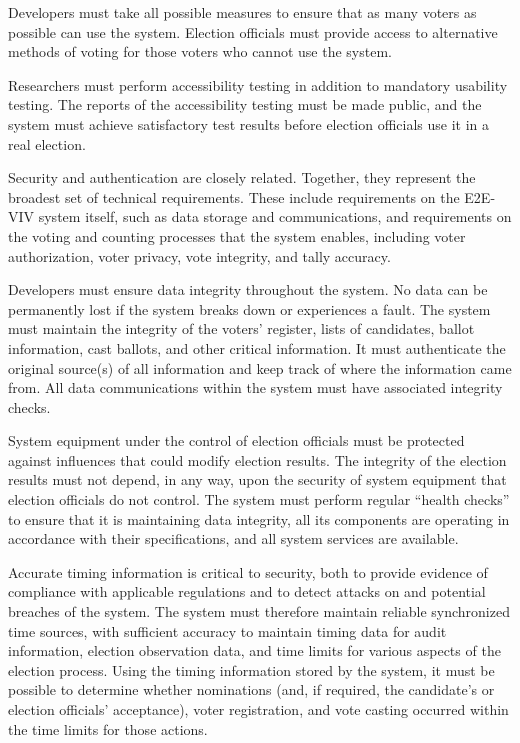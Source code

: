 Developers must take all possible measures to ensure that as many
voters as possible can use the system. Election officials must provide
access to alternative methods of voting for those voters who cannot
use the system.

Researchers must perform accessibility testing in addition to
mandatory usability testing. The reports of the accessibility testing
must be made public, and the system must achieve satisfactory test
results before election officials use it in a real election.

\clearpage\break


Security and authentication are closely related. Together, they
represent the broadest set of technical requirements. These include
requirements on the E2E-VIV system itself, such as data storage and
communications, and requirements on the voting and counting processes
that the system enables, including voter authorization, voter privacy,
vote integrity, and tally accuracy.

Developers must ensure data integrity throughout the system.  No data
can be permanently lost if the system breaks down or experiences a
fault. The system must maintain the integrity of the voters' register,
lists of candidates, ballot information, cast ballots, and other
critical information. It must authenticate the original source(s) of
all information and keep track of where the information came from. All
data communications within the system must have associated integrity
checks.

System equipment under the control of election officials must be
protected against influences that could modify election results. The
integrity of the election results must not depend, in any way, upon
the security of system equipment that election officials do not
control. The system must perform regular ``health checks'' to ensure
that it is maintaining data integrity, all its components are
operating in accordance with their specifications, and all system
services are available.

Accurate timing information is critical to security, both to provide
evidence of compliance with applicable regulations and to detect
attacks on and potential breaches of the system. The system must
therefore maintain reliable synchronized time sources, with sufficient
accuracy to maintain timing data for audit information, election
observation data, and time limits for various aspects of the election
process. Using the timing information stored by the system, it must be
possible to determine whether nominations (and, if required, the
candidate's or election officials' acceptance), voter registration,
and vote casting occurred within the time limits for those actions.

